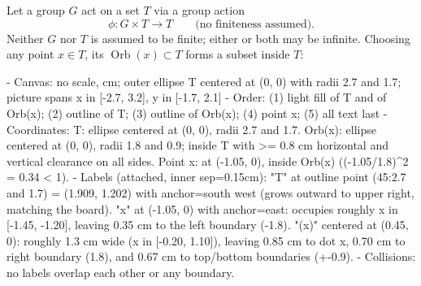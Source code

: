 \begin{content}
Let a group $G$ act on a set $T$ via a group action
\[
\phi \colon G \times T \to T \qquad \text{(no finiteness assumed)}.
\]
Neither $G$ nor $T$ is assumed to be finite; either or both may be infinite. Choosing any point $x \in T$, its  $\operatorname{Orb}(x) \subset T$ forms a subset inside $T$:

\begin{hidden}
- Canvas: no scale, cm; outer ellipse T centered at (0, 0) with radii 2.7 and 1.7; picture spans x in [-2.7, 3.2], y in [-1.7, 2.1]
- Order: (1) light fill of T and of Orb(x); (2) outline of T; (3) outline of Orb(x); (4) point x; (5) all text last
- Coordinates:
  T: ellipse centered at (0, 0), radii 2.7 and 1.7.
  Orb(x): ellipse centered at (0, 0), radii 1.8 and 0.9; inside T with >= 0.8 cm horizontal and vertical clearance on all sides.
  Point x: at (-1.05, 0), inside Orb(x) ((-1.05/1.8)^2 = 0.34 < 1).
- Labels (attached, inner sep=0.15cm):
  "T" at outline point (45:2.7 and 1.7) = (1.909, 1.202) with anchor=south west (grows outward to upper right, matching the board).
  "x" at (-1.05, 0) with anchor=east: occupies roughly x in [-1.45, -1.20], leaving 0.35 cm to the left boundary (-1.8).
  "(x)" centered at (0.45, 0): roughly 1.3 cm wide (x in [-0.20, 1.10]), leaving 0.85 cm to dot x, 0.70 cm to right boundary (1.8), and 0.67 cm to top/bottom boundaries (+-0.9).
- Collisions: no labels overlap each other or any boundary.
\end{hidden}
\begin{center}
\end{center}
\end{content}

